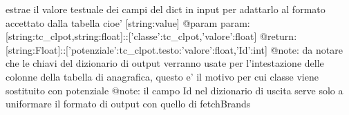 \label{classmmasgis_1_1AnagraficaDb_1_1tableDb_ac5de4387d8d299101c849599ce70a747}
\begin{DoxyVerb}
estrae il valore testuale dei campi del dict in input per adattarlo al formato accettato dalla tabella cioe' [{string:value}]
@param param: [{string:tc_clpot,string:float}]::[{'classe':tc_clpot,'valore':float}]
@return: [{string:Float}]::[{'potenziale':tc_clpot.testo:'valore':float,'Id':int}]
@note: da notare che le chiavi del dizionario di output verranno usate
per l'intestazione delle colonne della tabella di anagrafica, 
questo e' il motivo per cui classe viene sostituito con potenziale
@note: il campo Id nel dizionario di uscita serve solo a uniformare il formato di output con quello di fetchBrands

\end{DoxyVerb}
 

